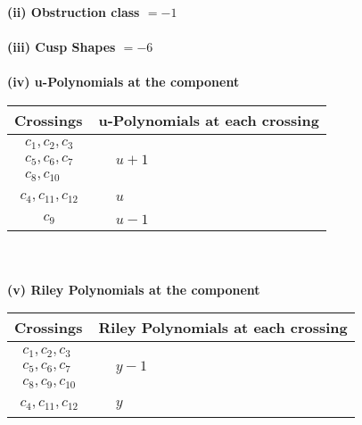 \documentclass[1p]{elsarticle_modified}
\theoremstyle{definition}
\begin{document}
\flushleft \textbf{(ii) Obstruction class $= -1$}\\~\\
\flushleft \textbf{(iii) Cusp Shapes $= -6$}\\~\\
\newpage\renewcommand{\arraystretch}{1}
\flushleft \textbf{(iv) u-Polynomials at the component}\newline \\
\begin{tabular}{m{50pt}|m{274pt}}
Crossings & \hspace{64pt}u-Polynomials at each crossing \\
\hline $$\begin{aligned}c_{1},c_{2},c_{3}\\c_{5},c_{6},c_{7}\\c_{8},c_{10}\end{aligned}$$&$\begin{aligned}
&u+1
\end{aligned}$\\
\hline $$\begin{aligned}c_{4},c_{11},c_{12}\end{aligned}$$&$\begin{aligned}
&u
\end{aligned}$\\
\hline $$\begin{aligned}c_{9}\end{aligned}$$&$\begin{aligned}
&u-1
\end{aligned}$\\
\hline
\end{tabular}\\~\\
\newpage\renewcommand{\arraystretch}{1}
\flushleft \textbf{(v) Riley Polynomials at the component}\newline \\
\begin{tabular}{m{50pt}|m{274pt}}
Crossings & \hspace{64pt}Riley Polynomials at each crossing \\
\hline $$\begin{aligned}c_{1},c_{2},c_{3}\\c_{5},c_{6},c_{7}\\c_{8},c_{9},c_{10}\end{aligned}$$&$\begin{aligned}
&y-1
\end{aligned}$\\
\hline $$\begin{aligned}c_{4},c_{11},c_{12}\end{aligned}$$&$\begin{aligned}
&y
\end{aligned}$\\
\hline
\end{tabular}\\~\\
\end{document}

